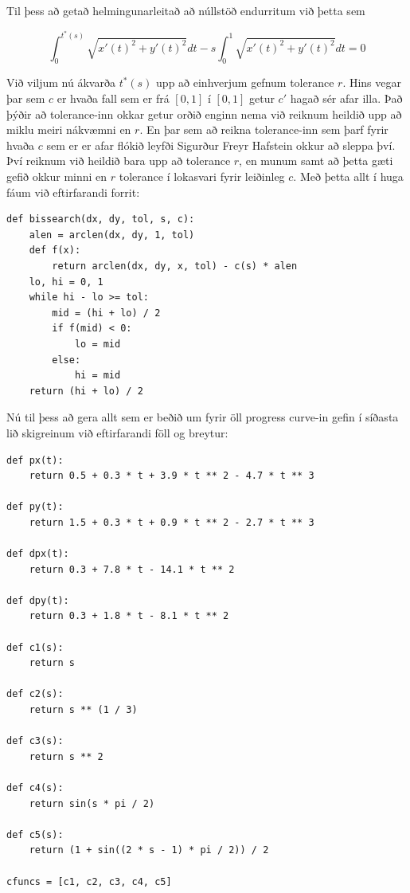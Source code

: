 \documentclass{article}
\begin{document}
Til þess að getað helmingunarleitað að núllstöð endurritum við þetta sem

\[\int_0^{t^*(s)} \sqrt{x'(t)^2 + y'(t)^2}dt - s\int_0^1 \sqrt{x'(t)^2 + y'(t)^2}dt = 0\]

Við viljum nú ákvarða $t^*(s)$ upp að einhverjum gefnum tolerance $r$. Hins vegar þar sem $c$ er hvaða fall sem er frá $[0, 1]$ í $[0, 1]$ getur $c'$ hagað sér afar illa. Það þýðir að tolerance-inn okkar getur orðið enginn nema við reiknum heildið upp að miklu meiri nákvæmni en $r$. En þar sem að reikna tolerance-inn sem þarf fyrir hvaða $c$ sem er er afar flókið leyfði Sigurður Freyr Hafstein okkur að sleppa því. Því reiknum við heildið bara upp að tolerance $r$, en munum samt að þetta gæti gefið okkur minni en $r$ tolerance í lokasvari fyrir leiðinleg $c$. Með þetta allt í huga fáum við eftirfarandi forrit: \\

\begin{verbatim}
def bissearch(dx, dy, tol, s, c):
    alen = arclen(dx, dy, 1, tol)
    def f(x):
        return arclen(dx, dy, x, tol) - c(s) * alen
    lo, hi = 0, 1
    while hi - lo >= tol:
        mid = (hi + lo) / 2
        if f(mid) < 0:
            lo = mid
        else:
            hi = mid
    return (hi + lo) / 2
\end{verbatim}

\vspace*{0.5cm}

Nú til þess að gera allt sem er beðið um fyrir öll progress curve-in gefin í síðasta lið skigreinum við eftirfarandi föll og breytur: \\

\begin{verbatim}
def px(t):
    return 0.5 + 0.3 * t + 3.9 * t ** 2 - 4.7 * t ** 3

def py(t):
    return 1.5 + 0.3 * t + 0.9 * t ** 2 - 2.7 * t ** 3
    
def dpx(t):
    return 0.3 + 7.8 * t - 14.1 * t ** 2

def dpy(t):
    return 0.3 + 1.8 * t - 8.1 * t ** 2

def c1(s):
    return s

def c2(s):
    return s ** (1 / 3)

def c3(s):
    return s ** 2

def c4(s):
    return sin(s * pi / 2)

def c5(s):
    return (1 + sin((2 * s - 1) * pi / 2)) / 2

cfuncs = [c1, c2, c3, c4, c5]
\end{verbatim}
\end{document}
